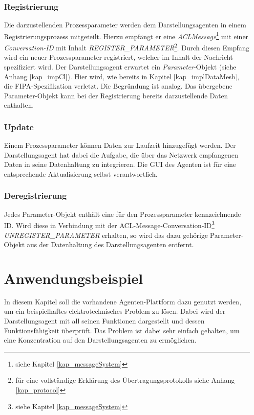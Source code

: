 \documentclass[a4paper,12pt,oneside,openright,onecolumn,final,titlepage,fleqn,ngerman]{scrreprt}
\newcommand{\repag}{Darstellungsagent}
\begin{document}
	\subsection{Registrierung}
	Die darzustellenden Prozessparameter werden dem \repag{}en in einem Registrierungsprozess mitgeteilt. Hierzu empfängt er eine \emph{ACLMessage}\footnote{siehe Kapitel \ref{kap_messageSystem}} mit einer \emph{Conversation-ID} mit Inhalt \emph{REGISTER\_PARAMETER}\footnote{für eine voll\-stän\-dige Erklärung des Übertragungsprotokolls siehe Anhang \ref{kap_protocol}}. Durch diesen Empfang wird ein neuer Prozessparameter registriert, welcher im Inhalt der Nachricht spezifiziert wird. Der \repag{} erwartet ein \emph{Parameter}-Objekt (siehe Anhang \ref{kap_impCl}). Hier wird, wie bereits in Kapitel \ref{kap_implDataMesh}, die FIPA-Spezifikation verletzt. Die Begründung ist analog. Das übergebene Parameter-Objekt kann bei der Registrierung bereits darzustellende Daten enthalten.
	
	\subsection{Update}\label{kap_implParverUpdate}
	Einem Prozessparameter können Daten zur Laufzeit hinzugefügt werden. Der \repag{} hat dabei die Aufgabe, die über das Netzwerk empfangenen Daten in seine Datenhaltung zu integrieren. Die GUI des Agenten ist für eine entsprechende Aktualisierung selbst verantwortlich.
	
	\subsection{Deregistrierung}
	Jedes Parameter-Objekt enthält eine für den Prozessparameter kennzeichnende ID. Wird diese in Verbindung mit der ACL-Message-Conversation-ID\footnote{siehe Kapitel \ref{kap_messageSystem}} \emph{UNREGISTER\_PARAMETER} erhalten, so wird das dazu gehörige Parameter-Objekt aus der Datenhaltung des \repag{}en entfernt.
	
	\chapter{Anwendungsbeispiel}
	In diesem Kapitel soll die vorhandene Agenten-Plattform dazu genutzt werden, um ein beispielhaftes elektrotechnisches Problem zu lösen. Dabei wird der \repag{} mit all seinen Funktionen dargestellt und dessen Funk\-tions\-fä\-hig\-keit überprüft. Das Problem ist dabei sehr einfach gehalten, um eine Konzentration auf den \repag{}en zu ermöglichen.
	
\end{document}
